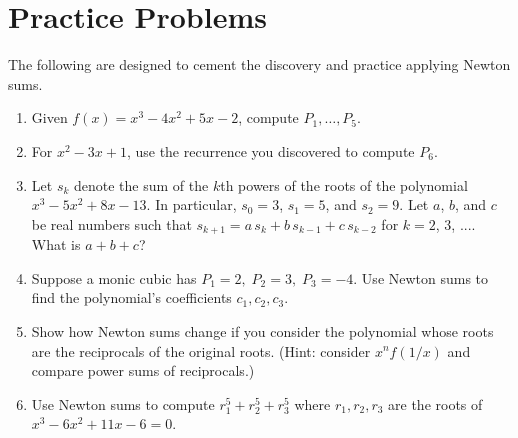\documentclass{tufte-handout}
\begin{document}
\bigskip
\section*{Practice Problems}
The following are designed to cement the discovery and practice applying Newton sums.

\begin{enumerate}[label=\textbf{P\arabic*.}, leftmargin=*, itemsep=1.2em]
  \item Given $f(x)=x^3-4x^2+5x-2$, compute $P_1,\dots, P_5$.
  \item For $x^2-3x+1$, use the recurrence you discovered to compute $P_6$.
  \item Let $s_k$ denote the sum of the $\textit{k}$th powers of the roots of the polynomial $x^3-5x^2+8x-13$. In particular, $s_0=3$, $s_1=5$, and $s_2=9$. Let $a$, $b$, and $c$ be real numbers such that $s_{k+1} = a \, s_k + b \, s_{k-1} + c \, s_{k-2}$ for $k = 2$, $3$, $....$ What is $a+b+c$?
  \item Suppose a monic cubic has $P_1=2,\; P_2=3,\; P_3=-4$. Use Newton sums to find the polynomial's coefficients $c_1,c_2,c_3$.
  \item Show how Newton sums change if you consider the polynomial whose roots are the reciprocals of the original roots. 
  (Hint: consider $x^n f(1/x)$ and compare power sums of reciprocals.)
  \item Use Newton sums to compute $r_1^5+r_2^5+r_3^5$ where $r_1,r_2,r_3$ are the roots of $x^3-6x^2+11x-6=0$.
\end{enumerate}

\bigskip
\end{document}
